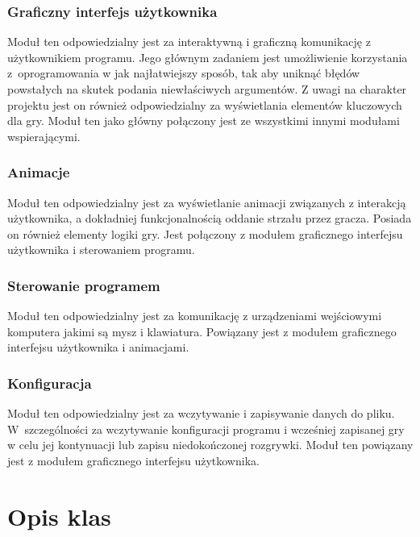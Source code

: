 \documentclass[a4paper]{article}
\begin{document}
\subsubsection{Graficzny interfejs użytkownika}
Moduł ten odpowiedzialny jest za interaktywną i graficzną komunikację z użytkownikiem programu. Jego głównym zadaniem jest umożliwienie korzystania z~oprogramowania w jak najłatwiejszy sposób, tak aby uniknąć błędów powstałych na skutek podania niewłaściwych argumentów. Z uwagi na charakter projektu jest on również odpowiedzialny za wyświetlania elementów kluczowych dla gry. Moduł ten jako główny połączony jest ze wszystkimi innymi modułami wspierającymi.

\subsubsection{Animacje}
Moduł ten odpowiedzialny jest za wyświetlanie animacji związanych z interakcją użytkownika, a dokładniej funkcjonalnością oddanie strzału przez gracza. Posiada on również elementy logiki gry. Jest połączony z modułem graficznego interfejsu użytkownika i sterowaniem programu.

\subsubsection{Sterowanie programem}
Moduł ten odpowiedzialny jest za komunikację z urządzeniami wejściowymi komputera jakimi są mysz i klawiatura. Powiązany jest z modułem graficznego interfejsu użytkownika i animacjami. 

\subsubsection{Konfiguracja}
Moduł ten odpowiedzialny jest za wczytywanie i zapisywanie danych do pliku. W~szczególności za wczytywanie konfiguracji programu i wcześniej zapisanej gry w celu jej kontynuacji lub zapisu niedokończonej rozgrywki. Moduł ten powiązany jest z modułem graficznego interfejsu użytkownika.

\section{Opis klas}
\end{document}
